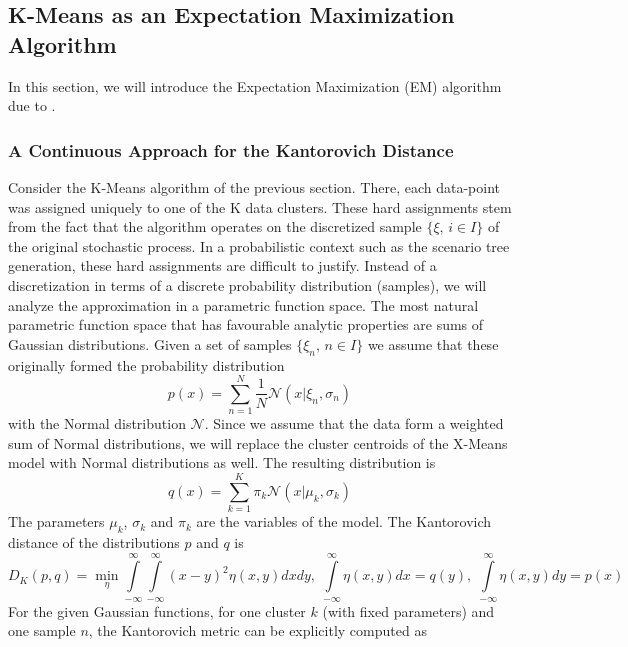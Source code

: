 
\subsection{K-Means as an Expectation Maximization Algorithm}
\label{sec:k-means-as-EM}
In this section, we will introduce the Expectation Maximization (EM) algorithm due to \cite{Dempster1977}.

\subsubsection{A Continuous Approach for the Kantorovich Distance}
\label{sec:cont-appr-kant}
Consider the K-Means algorithm of the previous section.
There, each data-point was assigned uniquely to one of the K data clusters.
These hard assignments stem from the fact that the algorithm operates on the discretized sample $\{\xi,\, i\in I\}$ of the original stochastic process.
In a probabilistic context such as the scenario tree generation, these hard assignments are difficult to justify.
Instead of a discretization in terms of a discrete probability distribution (samples), we will analyze the approximation in a parametric function space.
The most natural parametric function space that has favourable analytic properties are sums of Gaussian distributions.
Given a set of samples $\{\xi_n,\, n\in I\}$ we assume that these originally formed the probability distribution
\begin{equation}
  \label{eq:31}
  p(x) = \sum_{n=1}^N\frac{1}{N}\mathcal{N}(x|\xi_n,\sigma_n)
\end{equation}
with the Normal distribution $\mathcal{N}$.
Since we assume that the data form a weighted sum of Normal distributions, we will replace the cluster centroids of the X-Means model with Normal distributions as well. The resulting distribution is
\begin{equation}
  \label{eq:32}
  q(x) = \sum_{k=1}^K\pi_k\mathcal{N}(x|\mu_k, \sigma_k)
\end{equation}
The parameters $\mu_k$, $\sigma_k$ and $\pi_k$ are the variables of the model.
The Kantorovich distance of the distributions $p$ and $q$ is
\begin{equation}
  \label{eq:33}
  D_K(p,q) = \min\limits_{\eta}\int\limits_{-\infty}^{\infty}\int\limits_{-\infty}^{\infty}(x-y)^2\eta(x,y)dxdy,\; \int\limits_{-\infty}^{\infty}\eta(x,y)dx = q(y),\;\int\limits_{-\infty}^{\infty}\eta(x,y)dy = p(x)
\end{equation}
For the given Gaussian functions, for one cluster $k$ (with fixed parameters) and one sample $n$, the Kantorovich metric can be explicitly computed as
